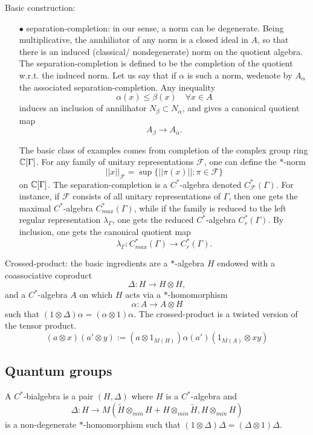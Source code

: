 Basic construction:
\begin{itemize}
\item[$\bullet$] separation-completion: in our sense, a norm can be degenerate. Being multiplicative, the annhiliator of any norm is a closed ideal in $A$, so that there is an induced (classical/ nondegenerate) norm on the quotient algebra. The separation-completion is defined to be the completion of the quotient w.r.t. the induced norm. Let us say that if $\alpha$ is such a norm, wedenote by $A_\alpha$ the associated separation-completion. Any inequality 
\[\alpha(x) \leq \beta (x) \quad \forall x\in A\]
induces an inclusion of annilihator $N_\beta \subset N_\alpha$, and gives a canonical quotient map
\[A_\beta \rightarrow A_\alpha.\]

The basic class of examples comes from completion of the complex group ring $\mathbb C[\Gamma]$. For any family of unitary representations $\mathcal F$, one can define the $*$-norm
\[||x||_{\mathcal F} = \sup \{||\pi(x)|| : \pi\in \mathcal F\}\]
on $\mathbb C[\Gamma]$. The separation-completion is a $C^*$-algebra denoted $C^*_{\mathcal F}(\Gamma)$. For instance, if $\mathcal F$ consists of all unitary representations of $\Gamma$, then one gets the maximal $C^*$-algebra $C_{max}^*(\Gamma)$, while if the family is reduced to the left regular representation $\lambda_\Gamma$, one gets the reduced $C^*$-algebra $C^*_r(\Gamma)$. By inclusion, one gets the canonical quotient map
\[\lambda_\Gamma : C^*_{max}(\Gamma) \rightarrow C_r^*(\Gamma).\]  
 
\end{itemize}

Crossed-product: the basic ingredients are a $*$-algebra $H$ endowed with a coassociative coproduct
\[\Delta : H \rightarrow H\otimes H,\]
and a $C^*$-algebra $A$ on which $H$ acts via a $*$-homomorphism
\[\alpha : A \rightarrow A\otimes H\]
such that $(1\otimes \Delta)\alpha = (\alpha \otimes 1) \alpha$. The crossed-product is a twisted version of the tensor product.  
\[(a\otimes x )(a'\otimes y ) := (a\otimes 1_{M(H)}) \alpha (a')(1_{M(A)}\otimes xy)\]

\subsection{Quantum groups}

A $C^*$-bialgebra is a pair $(H,\Delta)$ where $H$ is a $C^*$-algebra and 
\[\Delta: H \rightarrow M(\tilde H \otimes_{min} H + H\otimes_{min} \tilde H, H\otimes_{min} H)\]
is a non-degenerate $*$-homomorphism such that $(1\otimes \Delta) \Delta = (\Delta\otimes 1 ) \Delta$.\\

